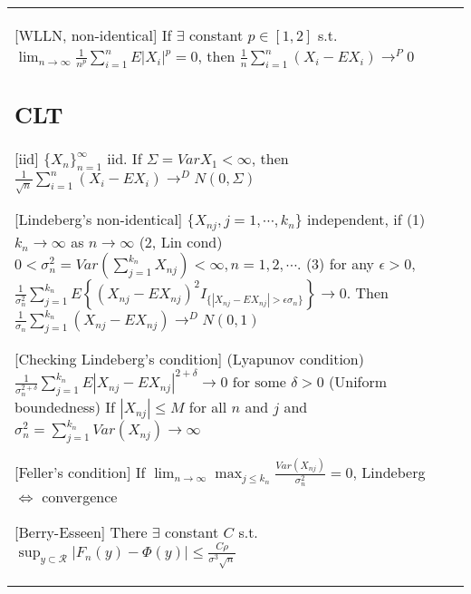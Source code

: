 \begin{tabulary}{\textwidth}{l || L}
	[WLLN, non-identical]
	If $\exists$ constant $p\in[1, 2]$ s.t.
	$\lim_{n\rightarrow\infty} \frac{1}{n^p} \sum_{i=1}^n E|X_i|^p = 0$, then
	$ \frac{1}{n}\sum_{i=1}^n (X_i-EX_i)\rightarrow^{P} 0 $

	\subsection{CLT}

	[iid]
	$\{X_n\}_{n=1}^\infty$ iid. If $\Sigma=VarX_1<\infty$, then
	$
		\frac{1}{\sqrt{n}}\sum_{i=1}^n (X_i-EX_i)\rightarrow^D N(0, \Sigma)
	$

	[Lindeberg's non-identical]
	$\{X_{nj}, j=1, \cdots, k_n\}$ independent, if
	(1) $k_n\rightarrow\infty$ as $n\rightarrow\infty$
	(2, Lin cond) $0<\sigma_n^2 = Var\left(\sum_{j=1}^{k_n} X_{nj}\right)<\infty, n=1, 2, \cdots$.
	(3) for any $\epsilon > 0$, $\frac{1}{\sigma_n^2}\sum_{j=1}^{k_n}E\left\{(X_{nj}-EX_{nj})^2I_{\{|X_{nj}-EX_{nj}|>\epsilon\sigma_n\}}\right\}\rightarrow 0$. Then
	$
		\frac{1}{\sigma_n}\sum_{j=1}^{k_n} (X_{nj}-EX_{nj})\rightarrow^D N(0, 1)
	$

	[Checking Lindeberg's condition]
	(Lyapunov condition)
	$
		\frac{1}{\sigma_n^{2+\delta}}\sum_{j=1}^{k_n} E|X_{nj}-EX_{nj}|^{2+\delta}\rightarrow 0 \text{ for some } \delta > 0
	$
	(Uniform boundedness)
	If $|X_{nj}|\leq M$ for all $n$ and $j$ and $\sigma_n^2 = \sum_{j=1}^{k_n}Var(X_{nj})\rightarrow \infty$

	[Feller's condition]
	If $
		\lim_{n\rightarrow \infty} \max_{j\leq k_n} \frac{Var(X_{nj})}{\sigma_n^2} = 0
	$,
	Lindeberg $\Leftrightarrow$ convergence


		[Berry-Esseen]
	There $\exists$ constant $C$ s.t.
	$
		\sup_{y\subset\mathcal{R}}|F_n(y)-\Phi(y)|\leq \frac{C\rho}{\sigma^3\sqrt{n}}
	$

\end{tabulary}
